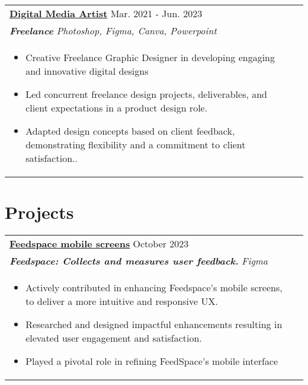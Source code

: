 \documentclass[a4paper,8pt]{article}
\begin{document}
\begin{tabularx}{\linewidth}{ @{}l r@{} }
\color[HTML]{1C033C} \textbf{\uline{Digital Media Artist}} \hfill \color[HTML]{371e77} Mar. 2021 - Jun. 2023 \\[4pt]
\color[HTML]{371e77}\textbf{\textit{Freelance}} \hfill \color[HTML]{4B28A4} \textit{Photoshop, Figma, Canva, Powerpoint} \\[5pt]
\begin{minipage}[t]{\linewidth}
    \begin{itemize}[nosep,after=\strut, leftmargin=2em, itemsep=2pt]
        \item Creative Freelance Graphic Designer in developing engaging and innovative digital designs
        \item Led concurrent freelance design projects, deliverables, and client expectations in a product design role.
        \item Adapted design concepts based on client feedback, demonstrating flexibility and a commitment to client satisfaction..
    \end{itemize}
    \end{minipage}
\end{tabularx}

\section{Projects}
\begin{tabularx}{\linewidth}{ @{}l r@{} }
\color[HTML]{1C033C} \textbf{\uline{\href{https://github.com/}{Feedspace mobile screens}}} \hfill \color[HTML]{371e77} October 2023  \\[4pt]
\color[HTML]{371e77}\textbf{\textit{Feedspace: Collects and measures user feedback.}} \hfill \color[HTML]{4B28A4} \textit{Figma} \\[5pt]
\begin{minipage}[t]{\linewidth}
    \begin{itemize}[nosep,after=\strut, leftmargin=2em, itemsep=2pt]
        \item Actively contributed in enhancing Feedspace's mobile screens, to deliver a more intuitive and responsive UX.
        \item Researched and designed impactful enhancements resulting in elevated user engagement and satisfaction.
        \item Played a pivotal role in refining FeedSpace's mobile interface
    \end{itemize}
    \end{minipage}
\end{tabularx}
\end{document}
